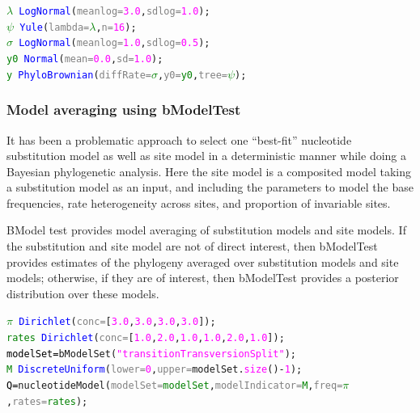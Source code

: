\documentclass[10pt,letterpaper,table]{article}
\begin{document}
{{\small
\begin{alltt}
  \textcolor{green}{\(\lambda\)} ~ \textcolor{blue}{LogNormal}(\textcolor{gray}{meanlog=}\textcolor{magenta}{3.0}, \textcolor{gray}{sdlog=}\textcolor{magenta}{1.0});
  \textcolor{green}{\(\psi\)} ~ \textcolor{blue}{Yule}(\textcolor{gray}{lambda=}\textcolor{green}{\(\lambda\)}, \textcolor{gray}{n=}\textcolor{magenta}{16});
  \textcolor{green}{\(\sigma\)} ~ \textcolor{blue}{LogNormal}(\textcolor{gray}{meanlog=}\textcolor{magenta}{1.0}, \textcolor{gray}{sdlog=}\textcolor{magenta}{0.5});
  \textcolor{green}{y0} ~ \textcolor{blue}{Normal}(\textcolor{gray}{mean=}\textcolor{magenta}{0.0}, \textcolor{gray}{sd=}\textcolor{magenta}{1.0});
  \textcolor{green}{y} ~ \textcolor{blue}{PhyloBrownian}(\textcolor{gray}{diffRate=}\textcolor{green}{\(\sigma\)}, \textcolor{gray}{y0=}\textcolor{green}{y0}, \textcolor{gray}{tree=}\textcolor{green}{\(\psi\)});
\end{alltt}
}

\subsubsection{Model averaging using bModelTest}

It has been a problematic approach to select one ``best-fit'' nucleotide substitution model as well as site model in a deterministic manner while doing a Bayesian phylogenetic analysis. Here the site model is a composited model taking a substitution model as an input, and including the parameters to model the base frequencies, rate heterogeneity across sites, and proportion of invariable sites.

BModel test \cite{bouckaert2017bmodeltestcomparison} provides model averaging of substitution models and site models. 
If the substitution and site model are not of direct interest, then bModelTest provides estimates of the phylogeny averaged over substitution models and site models; otherwise, if they are of interest, then bModelTest provides a posterior distribution over these models. \cite{bouckaert2019beastanalysis}

{\small
  \begin{alltt}
    \textcolor{green}{\(\pi\)} ~ \textcolor{blue}{Dirichlet}(\textcolor{gray}{conc=}[\textcolor{magenta}{3.0}, \textcolor{magenta}{3.0}, \textcolor{magenta}{3.0}, \textcolor{magenta}{3.0}]);
    \textcolor{green}{rates} ~ \textcolor{blue}{Dirichlet}(\textcolor{gray}{conc=}[\textcolor{magenta}{1.0}, \textcolor{magenta}{2.0}, \textcolor{magenta}{1.0}, \textcolor{magenta}{1.0}, \textcolor{magenta}{2.0}, \textcolor{magenta}{1.0}]);
    \textcolor{black}{modelSet = }\textcolor{magenta!80!black}{bModelSet}(\textcolor{magenta}{"transitionTransversionSplit"});
    \textcolor{green}{M} ~ \textcolor{blue}{DiscreteUniform}(\textcolor{gray}{lower=}\textcolor{magenta}{0}, \textcolor{gray}{upper=}modelSet.\textcolor{magenta}{size}()-\textcolor{magenta}{1});
    \textcolor{black}{Q = }\textcolor{magenta!80!black}{nucleotideModel}(\textcolor{gray}{modelSet=}\textcolor{green}{modelSet}, \textcolor{gray}{modelIndicator=}\textcolor{green}{M}, \textcolor{gray}{freq=}\textcolor{green}{\(\pi\)}, \textcolor{gray}{rates=}\textcolor{green}{rates});
\end{alltt}
}

}
\end{document}
